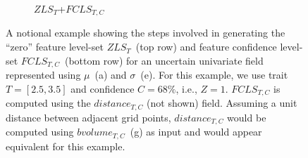 \begin{figure}[!t]
\begin{subfigure}{0.243\linewidth}
\vspace{-5mm}
\caption{{\scriptsize $ZLS_{T}$+$FCLS_{T,C}$}}
\label{fig:fclsTC}
\end{subfigure}
\caption{A notional example showing the steps involved in generating the ``zero'' feature level-set $ZLS_{T}$~(top row) and feature confidence level-set $FCLS_{T,C}$~(bottom row) for an uncertain univariate field represented using ${\mu}$~(a) and ${\sigma}$~(e).
%
For this example, we use trait $T=[2.5, 3.5]$ and confidence $C=68\%$, i.e., $Z=1$.
%
$FCLS_{T,C}$ is computed using the $distance_{T,C}$ (not shown) field.
%
Assuming a unit distance between adjacent grid points,
%
$distance_{T,C}$ would be computed using $bvolume_{T,C}$~(g) as input and would appear equivalent for this example.
}
\label{fig:example}
\end{figure}

